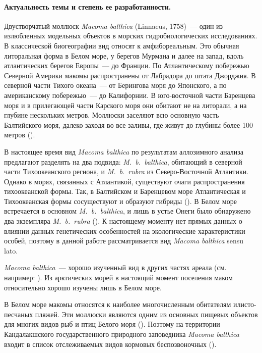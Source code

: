 \paragraph {Актуальность темы и степень ее разработанности.}
Двустворчатый моллюск {\it Macoma balthica} (Linnaeus, 1758)~--- один из излюбленных модельных объектов в морских гидробиологических исследованиях. 
В классической биогеографии вид относят к амфибореальным. 
Это обычная литоральная форма в Белом море, у берегов Мурмана и далее на запад, вдоль атлантических берегов Европы~--- до Франции. 
По Атлантическому побережью Северной Америки макомы распространены от Лабрадора до штата Джорджия. 
В северной части Тихого океана~--- от Берингова моря до Японского, а по американскому побережью~--- до Калифорнии. 
В юго-восточной части Баренцева моря и в прилегающей части Карского моря они обитают  не на литорали, а на глубине нескольких метров. 
Моллюски заселяют всю основную часть Балтийского моря, далеко заходя во все заливы, где живут до глубины более 100 метров (\cite{Zacepin_Filatova_1968}).

В настоящее время вид {\it Macoma balthica} по результатам аллозимного анализа предлагают разделять на два подвида: {\it M.~b.~balthica}, обитающий в северной части Тихоокеанского региона, и {\it M.~b.~rubra} из Северо-Восточной Атлантики. 
Однако  в морях, связанных с  Атлантикой, существуют очаги распространения тихоокеанской формы. 
Так, в Балтийском и Баренцевом море Атлантическая и Тихоокеанская формы сосуществуют и образуют гибриды (\cite{Vainola_2003}). 
В Белом море встречается в основном {\it M.~b.~balthica}, и лишь в устье Онеги было обнаружено два экземпляра {\it M.~b.~rubra} (\cite{Nikula_et_al_2007}).
К настоящему моменту нет прямых данных о влиянии данных генетических особенностей на экологические характеристики особей, поэтому в данной работе рассматривается вид {\it Macoma balthica} sensu lato.

{\it Macoma balthica}~--- хорошо изученный вид в других частях ареала (см. например: \cite{Segerstrale_1960, Lavoie_1970, Gilbert_1978, Vincent_et_al_1989, Hiddink_et_al_2002_predation_epifauna, Hiddink_et_al_2002_predation_infauna, Beukema_et_al_2009}). 
Из арктических морей в настоящий момент поселения маком относительно хорошо изучены лишь в Белом море.

В Белом море макомы относятся к наиболее многочисленным обитателям илисто-песчаных пляжей. 
Эти моллюски являются одним из основных пищевых объектов для многих видов рыб и птиц Белого моря (\cite{Azarov_1963, Percov_1963, Golcev_et_al_1997, Bianki_et_al_2003}). 
Поэтому на территории Кандалакшского государственного природного заповедника {\it Macoma balthica} входит в список отслеживаемых видов кормовых беспозвоночных (\cite{Nazarova_2003}).

